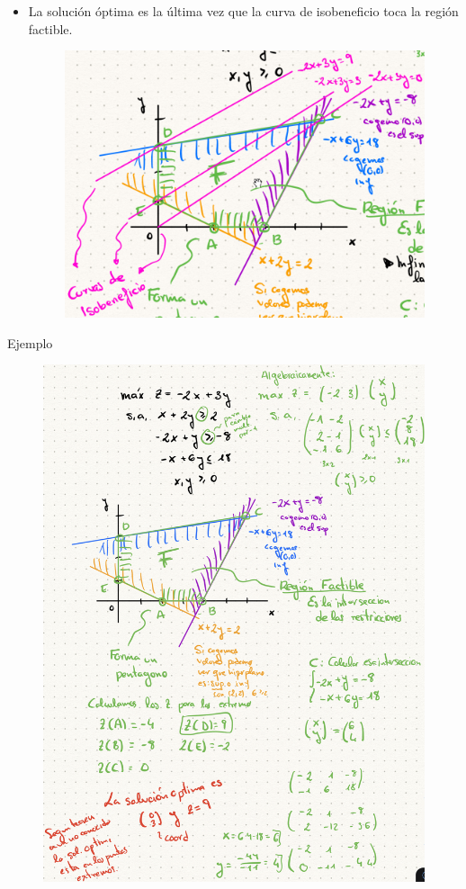 \documentclass[12pt, twoside, openright]{report} %
\begin{document}
  \begin{itemize}
  \item La solución óptima es la última vez que la curva de
  isobeneficio toca la región factible.
  \begin{figure}[H]
	{\includegraphics[scale=.2]{Untitled 1.png}}
\end{figure}
  \end{itemize}
  Ejemplo
  \begin{figure}[H]
	{\includegraphics[scale=.3]{C96D1F11-207B-43BF-A121-0E3028966D13.jpeg}}
\end{figure}
\end{document}

